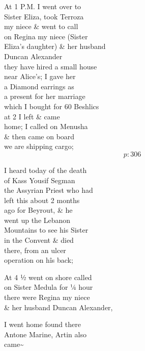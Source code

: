 \documentclass{report}
\begin{document}
	\par{
 	At 1 P.M. I went over to\ \\Sister Eliza, took Terroza\ \\my niece \& went to call\ \\on Regina my niece (Sister\ \\Eliza’s daughter) \& her husband\ \\Duncan Alexander\ \\they have hired a small house\ \\near Alice’s; I gave her\ \\a Diamond earrings as\ \\a present for her marriage\ \\which I bought for 60 Beshlics\ \\at 2 I left \& came\ \\home; I called on Menusha\ \\\& then came on board\ \\we are shipping cargo;\ \\
  \[p: 306 \]

	}

	\par{
 	I heard today of the death\ \\of Kass Yousif Segman\ \\the Assyrian Priest who had\ \\left this about 2 months\ \\ago for Beyrout, \& he\ \\went up the Lebanon\ \\Mountains to see his Sister\ \\in the Convent \& died\ \\there, from an ulcer\ \\operation on hîs back;\ \\
	}

	\par{
 	At 4 ½ went on shore called\ \\on Sister Medula for ¼ hour\ \\there were Regina my niece\ \\\& her husband Duncan Alexander,\ \\
	}

	\par{
 	I went home found there\ \\Antone Marine, Artin also\ \\came\~{}\ \\
	}
\end{document}
